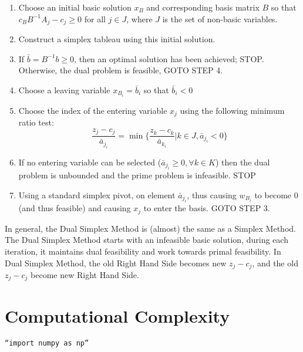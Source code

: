                 \begin{enumerate}
                    \item Choose an initial basic solution $x_B$ and corresponding basis matrix $B$ so that $c_BB^{-1}A_j - c_j \ge 0$ for all $j \in J$, where $J$ is the set of non-basic variables.
                    \item Construct a simplex tableau using this initial solution.
                    \item If $\bar{b} = B^{-1}b \ge 0$, then an optimal solution has been achieved; STOP. Otherwise, the dual problem is feasible, GOTO STEP 4.
                    \item Choose a leaving variable $x_{B_i} = \bar{b}_i$ so that $\bar{b}_i < 0$
                    \item Choose the index of the entering variable $x_j$ using the following minimum ratio test:
                    \begin{equation*}
                        \frac{z_j - c_j}{\bar{a}_{j_i}} = \min \{\frac{z_k - c_k}{\bar{a}_{k_i}}|k \in J, \bar{a}_{j_i} < 0\}
                    \end{equation*}
                    \item If no entering variable can be selected ($\bar{a}_{j_i} \ge 0, \forall k \in K$) then the dual problem is unbounded and the prime problem is infeasible. STOP
                    \item Using a standard simplex pivot, on element $\bar{a}_{j_i}$, thus causing $w_{B_i}$ to become 0 (and thus feasible) and causing $x_j$ to enter the basis. GOTO STEP 3.
                \end{enumerate}

                In general, the Dual Simplex Method is (almost) the same as a Simplex Method. The Dual Simplex Method starts with an infeasible basic solution, during each iteration, it maintains dual feasibility and work towards primal feasibility. In Dual Simplex Method, the old Right Hand Side becomes new $z_j - c_j$, and the old $z_j - c_j$ become new Right Hand Side.

    \chapter{Computational Complexity} 
        \begin{center}
            \texttt{``import numpy as np''}
        \end{center}

